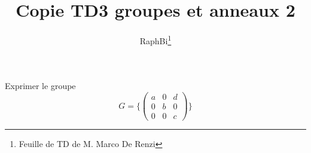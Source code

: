 \documentclass[french,a4paper,10pt]{article}
\title{\color{astral} \sffamily \bfseries Copie TD3 groupes et anneaux 2 }
\author{RaphBi\thanks{Feuille de TD de M. Marco De Renzi}}
\begin{document}
    \maketitle
    \begin{td-exo}[1]
        Exprimer le groupe\\
        $$G = \{\begin{pmatrix}
            a & 0 & d\\
            0 & b & 0\\
            0 & 0 & c 
        \end{pmatrix}\}$$

    \end{td-exo}
\end{document}
